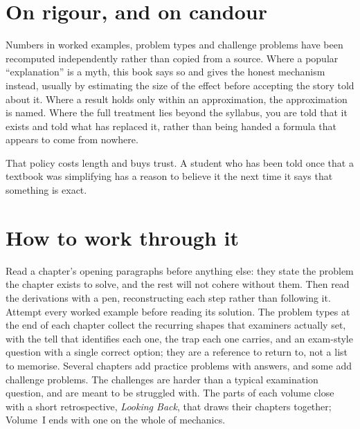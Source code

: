 \endgroup

\section*{On rigour, and on candour}

Numbers in worked examples, problem types and challenge problems have been recomputed independently
rather than copied from a source. Where a popular ``explanation'' is a myth, this book says so and gives the honest
mechanism instead, usually by estimating the size of the effect before accepting the story told about
it. Where a result holds only within an approximation, the approximation is named. Where the full
treatment lies beyond the syllabus, you are told that it exists and told what has replaced it, rather
than being handed a formula that appears to come from nowhere.

That policy costs length and buys trust. A student who has been told once that a textbook was
simplifying has a reason to believe it the next time it says that something is exact.

\section*{How to work through it}

Read a chapter's opening paragraphs before anything else: they state the problem the chapter exists to
solve, and the rest will not cohere without them. Then read the derivations with a pen, reconstructing
each step rather than following it. Attempt every worked example before reading its solution. The
problem types at the end of each chapter collect the recurring shapes that examiners actually set,
with the tell that identifies each one, the trap each one carries, and an exam-style question with a
single correct option; they are a reference to return to, not a list to memorise. Several chapters add
practice problems with answers, and some add challenge problems. The challenges are harder than a
typical examination question, and are meant to be struggled with. The parts of each volume close with a short
retrospective, \emph{Looking Back}, that draws their chapters together; Volume~I ends with one on the
whole of mechanics.

\cleardoublepage
\tableofcontents
\cleardoublepage

